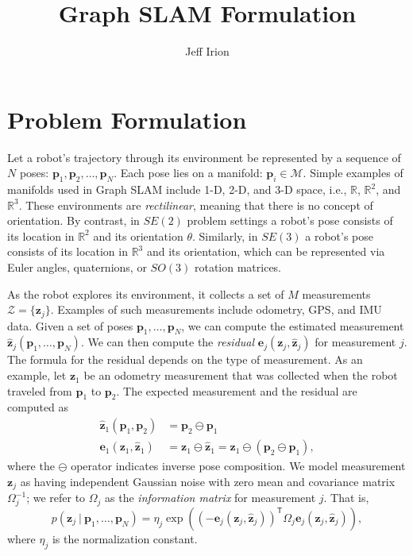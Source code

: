 \documentclass{article}
\def\keyterm{\textit}
\newcommand{\transp}{{\scriptstyle{\mathsf{T}}}}
\begin{document}
\title{Graph SLAM Formulation}
\author{Jeff Irion}
\date{}

\maketitle
\vspace{3em}


\section{Problem Formulation}

Let a robot's trajectory through its environment be represented by a sequence of $N$ poses: $\mathbf{p}_1, \mathbf{p}_2, \ldots, \mathbf{p}_N$.  Each pose lies on a manifold: $\mathbf{p}_i \in \mathcal{M}$.  Simple examples of manifolds used in Graph SLAM include 1-D, 2-D, and 3-D space, i.e., $\mathbb{R}$, $\mathbb{R}^2$, and $\mathbb{R}^3$.  These environments are \keyterm{rectilinear}, meaning that there is no concept of orientation.  By contrast, in $SE(2)$ problem settings a robot's pose consists of its location in $\mathbb{R}^2$ and its orientation $\theta$.  Similarly, in $SE(3)$ a robot's pose consists of its location in $\mathbb{R}^3$ and its orientation, which can be represented via Euler angles, quaternions, or $SO(3)$ rotation matrices.  

As the robot explores its environment, it collects a set of $M$ measurements $\mathcal{Z} = \{\mathbf{z}_j\}$.  Examples of such measurements include odometry, GPS, and IMU data.  Given a set of poses $\mathbf{p}_1, \ldots, \mathbf{p}_N$, we can compute the estimated measurement $\hat{\mathbf{z}}_j(\mathbf{p}_1, \ldots, \mathbf{p}_N)$.  We can then compute the \keyterm{residual} $\mathbf{e}_j(\mathbf{z}_j, \hat{\mathbf{z}}_j)$ for measurement $j$.  The formula for the residual depends on the type of measurement.  As an example, let $\mathbf{z}_1$ be an odometry measurement that was collected when the robot traveled from $\mathbf{p}_1$ to $\mathbf{p}_2$.  The expected measurement and the residual are computed as
%
\begin{align*}
    \hat{\mathbf{z}}_1(\mathbf{p}_1, \mathbf{p}_2) &= \mathbf{p}_2 \ominus \mathbf{p}_1 \\
    \mathbf{e}_1(\mathbf{z}_1, \hat{\mathbf{z}}_1) &= \mathbf{z}_1 \ominus \hat{\mathbf{z}}_1 = \mathbf{z}_1 \ominus (\mathbf{p}_2 \ominus \mathbf{p}_1),
\end{align*}
%
where the $\ominus$ operator indicates inverse pose composition.  We model measurement $\mathbf{z}_j$ as having independent Gaussian noise with zero mean and covariance matrix $\Omega_j^{-1}$; we refer to $\Omega_j$ as the \keyterm{information matrix} for measurement $j$.  That is,
\begin{equation}
    p(\mathbf{z}_j \ | \ \mathbf{p}_1, \ldots, \mathbf{p}_N) = \eta_j \exp \left( (-\mathbf{e}_j(\mathbf{z}_j, \hat{\mathbf{z}}_j))^\transp \Omega_j \mathbf{e}_j(\mathbf{z}_j, \hat{\mathbf{z}}_j) \right), \label{eq:observation_probability}
\end{equation}
where $\eta_j$ is the normalization constant.
\end{document}
